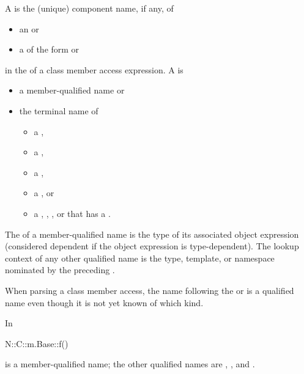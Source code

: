 \pnum
A  is
the (unique) component name, if any, of
\begin{itemize}
\item
an  or
\item
a  of the form
 \tcode{::} or  \tcode{::}
\end{itemize}
in the  of a class member access expression.
A  is
\begin{itemize}
\item a member-qualified name or
\item the terminal name of
\begin{itemize}
\item a ,
\item a ,
\item a ,
\item a , or
\item a ,
,
, or
that has a .
\end{itemize}
\end{itemize}
The  of a member-qualified name is
the type of its associated object expression
(considered dependent if the object expression is type-dependent).
The lookup context of any other qualified name is
the type, template, or namespace
nominated by the preceding .
\begin{note}
When parsing a class member access,
the name following the \tcode{->} or  is
a qualified name even though it is not yet known of which kind.
\end{note}
\begin{example}
In
\begin{codeblock}
  N::C::m.Base::f()
\end{codeblock}
 is a member-qualified name;
the other qualified names are , , and .
\end{example}

